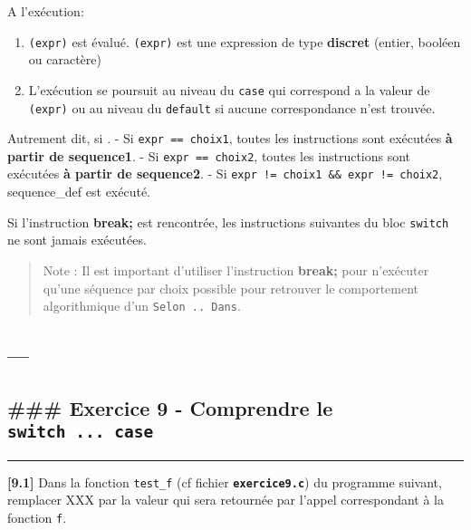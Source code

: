 \documentclass[11pt]{article}
\providecommand{\tightlist}{%
      \setlength{\itemsep}{0pt}\setlength{\parskip}{0pt}}
\begin{document}
A l'exécution:

\begin{enumerate}
\def\labelenumi{\arabic{enumi}.}
\tightlist
\item
  \texttt{(expr)} est évalué. \texttt{(expr)} est une expression de type
  \textbf{discret} (entier, booléen ou caractère)
\item
  L'exécution se poursuit au niveau du \texttt{case} qui correspond a la
  valeur de \texttt{(expr)} ou au niveau du \texttt{default} si aucune
  correspondance n'est trouvée.
\end{enumerate}

Autrement dit, si . - Si \texttt{expr\ ==\ choix1}, toutes les
instructions sont exécutées \textbf{à partir de sequence1}. - Si
\texttt{expr\ ==\ choix2}, toutes les instructions sont exécutées
\textbf{à partir de sequence2}. - Si
\texttt{expr\ !=\ choix1\ \&\&\ expr\ !=\ choix2}, sequence\_def est
exécuté.

Si l'instruction \textbf{break;} est rencontrée, les instructions
suivantes du bloc \texttt{switch} ne sont jamais exécutées.

\begin{quote}
Note : Il est important d'utiliser l'instruction \textbf{break;} pour
n'exécuter qu'une séquence par choix possible pour retrouver le
comportement algorithmique d'un \texttt{Selon\ ..\ Dans}.
\end{quote}

    \hypertarget{section}{%
\subsection{---}\label{section}}

\hypertarget{exercice-9---comprendre-le-switch-...-case}{%
\subsection{\texorpdfstring{\#\#\# Exercice 9 - Comprendre le
\texttt{switch\ ...\ case}}{\#\#\# Exercice 9 - Comprendre le switch ... case}}\label{exercice-9---comprendre-le-switch-...-case}}

\begin{center}\rule{0.5\linewidth}{0.5pt}\end{center}

    \textbf{{[}9.1{]}} Dans la fonction \texttt{test\_f} (cf fichier
\textbf{\texttt{exercice9.c}}) du programme suivant, remplacer XXX par
la valeur qui sera retournée par l'appel correspondant à la fonction
\texttt{f}.
\end{document}
